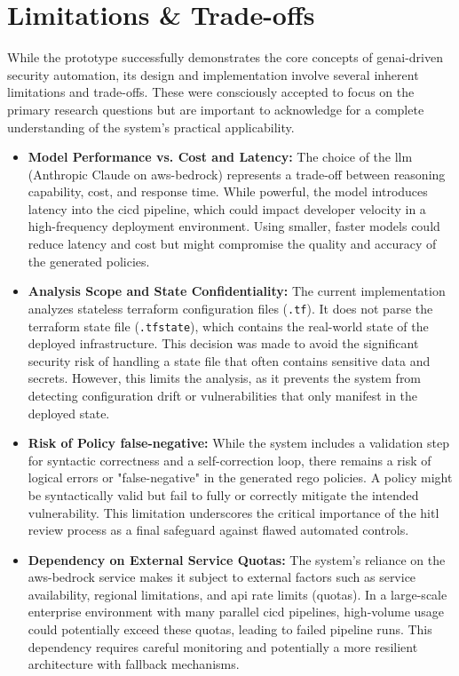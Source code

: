\section{Limitations \& Trade-offs}
\label{sec:limitations_tradeoffs}

While the prototype successfully demonstrates the core concepts of \gls{genai}-driven security automation, its design and implementation involve several inherent limitations and trade-offs. These were consciously accepted to focus on the primary research questions but are important to acknowledge for a complete understanding of the system's practical applicability.
\begin{itemize}
    \item \textbf{Model Performance vs. Cost and Latency:} The choice of the \gls{llm} (Anthropic Claude on \gls{aws-bedrock}) represents a trade-off between reasoning capability, cost, and response time. While powerful, the model introduces latency into the \gls{cicd} pipeline, which could impact developer velocity in a high-frequency deployment environment. Using smaller, faster models could reduce latency and cost but might compromise the quality and accuracy of the generated policies.
    \item \textbf{Analysis Scope and State Confidentiality:} The current implementation analyzes stateless \gls{terraform} configuration files (\texttt{.tf}). It does not parse the \gls{terraform} state file (\texttt{.tfstate}), which contains the real-world state of the deployed infrastructure. This decision was made to avoid the significant security risk of handling a state file that often contains sensitive data and secrets. However, this limits the analysis, as it prevents the system from detecting configuration drift or vulnerabilities that only manifest in the deployed state.
    \item \textbf{Risk of Policy \gls{false-negative}:} While the system includes a validation step for syntactic correctness and a self-correction loop, there remains a risk of logical errors or "\gls{false-negative}" in the generated \gls{rego} policies. A policy might be syntactically valid but fail to fully or correctly mitigate the intended vulnerability. This limitation underscores the critical importance of the \gls{hitl} review process as a final safeguard against flawed automated controls.
    \item \textbf{Dependency on External Service Quotas:} The system's reliance on the \gls{aws-bedrock} service makes it subject to external factors such as service availability, regional limitations, and \gls{api} rate limits (quotas). In a large-scale enterprise environment with many parallel \gls{cicd} pipelines, high-volume usage could potentially exceed these quotas, leading to failed pipeline runs. This dependency requires careful monitoring and potentially a more resilient architecture with fallback mechanisms.

\end{itemize}
